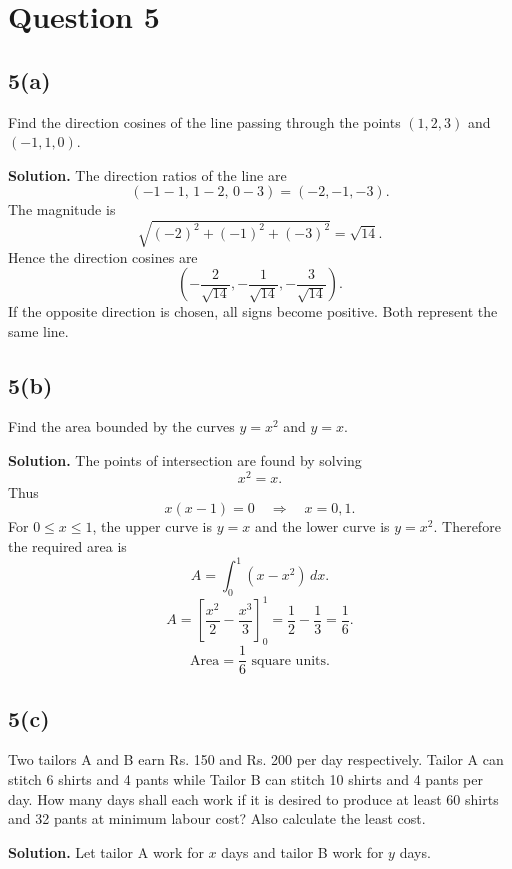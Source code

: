 \documentclass[11pt,a4paper]{article}
\newcommand{\ans}{\textbf{Solution.} }
\newcommand{\final}[1]{\[\boxed{#1}\]}
\begin{document}
\section*{Question 5}

\subsection*{5(a)}
\begin{questionbox}
Find the direction cosines of the line passing through the points $(1,2,3)$ and $(-1,1,0)$.
\end{questionbox}
\ans
The direction ratios of the line are
\[
(-1-1,\,1-2,\,0-3)=(-2,-1,-3).
\]
The magnitude is
\[
\sqrt{(-2)^2+(-1)^2+(-3)^2}=\sqrt{14}.
\]
Hence the direction cosines are
\final{\left(-\frac{2}{\sqrt{14}},-\frac{1}{\sqrt{14}},-\frac{3}{\sqrt{14}}\right).}
If the opposite direction is chosen, all signs become positive. Both represent the same line.

\subsection*{5(b)}
\begin{questionbox}
Find the area bounded by the curves $y=x^2$ and $y=x$.
\end{questionbox}
\ans
The points of intersection are found by solving
\[
x^2=x.
\]
Thus
\[
x(x-1)=0 \quad\Rightarrow\quad x=0,1.
\]
For $0\le x\le 1$, the upper curve is $y=x$ and the lower curve is $y=x^2$.
Therefore the required area is
\[
A=\int_0^1 (x-x^2)\,dx.
\]
\[
A=\left[\frac{x^2}{2}-\frac{x^3}{3}\right]_0^1
=\frac12-\frac13=\frac16.
\]
\final{\text{Area}=\frac16\text{ square units}.}

\begin{center}
\end{center}

\subsection*{5(c)}
\begin{questionbox}
Two tailors A and B earn Rs. 150 and Rs. 200 per day respectively. Tailor A can stitch 6 shirts and 4 pants while Tailor B can stitch 10 shirts and 4 pants per day. How many days shall each work if it is desired to produce at least 60 shirts and 32 pants at minimum labour cost? Also calculate the least cost.
\end{questionbox}
\ans
Let tailor A work for $x$ days and tailor B work for $y$ days.
\end{document}
